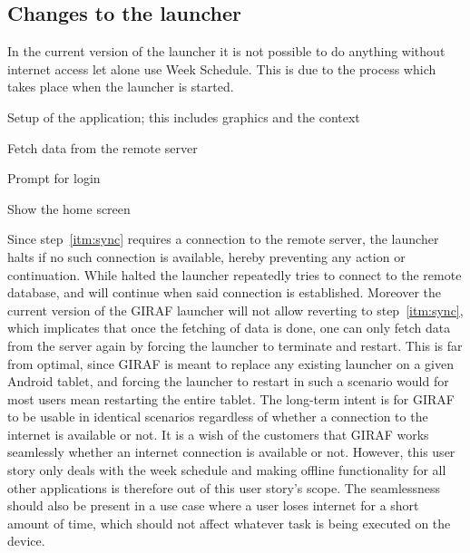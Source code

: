 \subsection{Changes to the launcher}
\label{sub:changes_to_the_launcher}
In the current version of the launcher it is not possible to do anything without internet access let alone use Week Schedule.
This is due to the process which takes place when the launcher is started. 
\begin{enumberate}
    \item Setup of the application; this includes graphics and the context
    \item\label{itm:sync} Fetch data from the remote server
    \item Prompt for login
    \item Show the home screen
\end{enumberate}
Since step~\ref{itm:sync} requires a connection to the remote server, the launcher halts if no such connection is available, hereby preventing any action or continuation.
While halted the launcher repeatedly tries to connect to the remote database, and will continue when said connection is established.
Moreover the current version of the GIRAF launcher will not allow reverting to step~\ref{itm:sync}, which implicates that once the fetching of data is done, one can only fetch data from the server again by forcing the launcher to terminate and restart.
This is far from optimal, since GIRAF is meant to replace any existing launcher on a given Android tablet, and forcing the launcher to restart in such a scenario would for most users mean restarting the entire tablet.
The long-term intent is for GIRAF to be usable in identical scenarios regardless of whether a connection to the internet is available or not.
It is a wish of the customers that GIRAF works seamlessly whether an internet connection is available or not.
However, this user story only deals with the week schedule and making offline functionality for all other applications is therefore out of this user story's scope.
The seamlessness should also be present in a use case where a user loses internet for a short amount of time, which should not affect whatever task is being executed on the device. 

